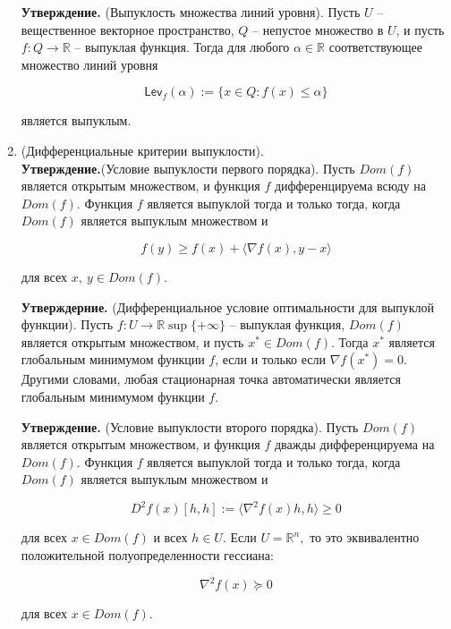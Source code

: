\begin{enumerate}
    \textbf{Утверждение.} (Выпуклость множества линий уровня). Пусть $U$ -- вещественное векторное пространство, $Q$ -- непустое множество в $U$, и пусть $f : Q \to \mathbb{R}$ -- выпуклая функция. Тогда для любого $\alpha \in \mathbb{R}$ соответствующее множество линий уровня

    $$\mathsf{Lev}_f(\alpha) := \{x\in Q: f(x) \leq \alpha\}$$

    является выпуклым.

    \item (Дифференциальные критерии выпуклости).\\
    \textbf{Утверждение.}(Условие выпуклости первого порядка). Пусть $Dom(f)$ является открытым множеством, и функция $f$ дифференцируема всюду на $Dom(f).$ Функция $f$ является выпуклой тогда и только тогда, когда $Dom(f)$ является выпуклым множеством и

    $$f(y) \geq f(x) + \langle\nabla f(x), y - x\rangle$$

    для всех $x,\ y\in Dom(f).$
    \bigskip

    \textbf{Утверждерние.} (Дифференциальное условие оптимальности для выпуклой функции). Пусть $f : U \to \mathbb{R}\sup \{+\infty\}$ -- выпуклая функция, $Dom(f)$ является открытым множеством, и пусть $x^* \in Dom(f).$ Тогда $x^*$ является глобальным минимумом функции $f$, если и только если $\nabla f(x^*) = 0.$ Другими словами, любая стационарная точка автоматически является глобальным минимумом функции $f.$

    \textbf{Утверждение.} (Условие выпуклости второго порядка). Пусть $Dom(f)$ является открытым множеством, и функция $f$ дважды дифференцируема на $Dom(f)$. Функция $f$ является выпуклой тогда и только тогда, когда $Dom(f)$ является выпуклым множеством и

    $$D^2f(x)[h, h] := \langle\nabla^2 f(x) h, h\rangle \geq 0$$

    для всех $x\in Dom(f)$ и всех $h\in U$. Если $U = \mathbb{R}^n,$ то это эквивалентно положительной полуопределенности гессиана:

    $$\nabla^2 f(x) \succcurlyeq 0$$

    для всех $x\in Dom(f).$

\end{enumerate}